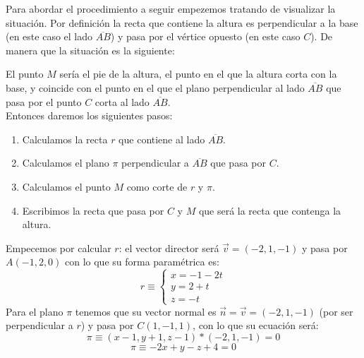 \documentclass[a4paper,11pt,answers]{exam}
\begin{document}
\begin{questions}
\begin{solution}
Para abordar el procedimiento a seguir empezemos tratando de visualizar la situación. Por definición la recta que contiene la altura es perpendicular a la base (en este caso el lado $\overline{AB}$) y pasa por el vértice opuesto (en este caso $C$). De manera que la situación es la siguiente:
\begin{center}
\end{center}
El punto $M$ sería el pie de la altura, el punto en el que la altura corta con la base, y coincide con el punto en el que el plano perpendicular al lado $\overline{AB}$ que pasa por el punto $C$ corta al lado $\overline{AB}$.\\
Entonces daremos los siguientes pasos:
\begin{enumerate}
	\item Calculamos la recta $r$ que contiene al lado $\overline{AB}$.
	\item Calculamos el plano $\pi$ perpendicular a $\overline{AB}$ que pasa por $C$.
	\item Calculamos el punto $M$ como corte de $r$ y $\pi$.
	\item Escribimos la recta que pasa por $C$ y $M$ que será la recta que contenga la altura.
\end{enumerate}
Empecemos por calcular $r$: el vector director será $\vec v = (-2,1,-1) $ y pasa por $A(-1,2,0)$ con lo que su forma paramétrica es:
\[r \equiv \begin{cases}
x=-1 -2 t\\y = 2 + t\\z = -t
\end{cases}\]
Para el plano $\pi$ tenemos que su vector normal es $\vec{n} = \vec{v} = (-2,1,-1)$ (por ser perpendicular a $r$) y pasa por $C(1, -1, 1)$, con lo que su ecuación será:
\[\pi \equiv (x-1, y + 1, z-1) * (-2, 1, -1) = 0\]
\[\pi \equiv -2x + y - z +4 = 0\]


\end{solution}
\end{questions}
\end{document}
